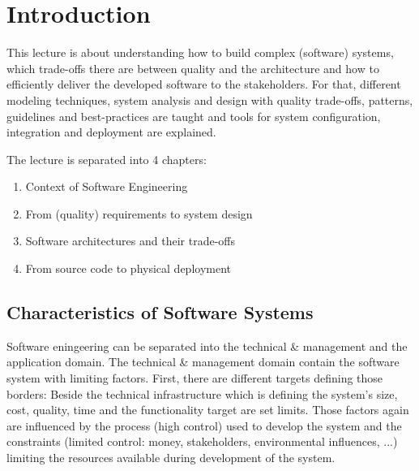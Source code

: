 
\section{Introduction}
This lecture is about understanding how to build complex (software) systems, which trade-offs there are between quality and the architecture and how to efficiently deliver the developed software to the stakeholders.
For that, different modeling techniques, system analysis and design with quality trade-offs, patterns, guidelines and best-practices are taught and tools for system configuration, integration and deployment are explained.

The lecture is separated into 4 chapters:
\begin{enumerate}
    \item Context of Software Engineering
    \item From (quality) requirements to system design
    \item Software architectures and their trade-offs
    \item From source code to physical deployment
\end{enumerate}

\subsection{Characteristics of Software Systems}
Software eningeering can be separated into the technical \& management and the application domain.
The technical \& management domain contain the software system with limiting factors.
First, there are different targets defining those borders: Beside the technical infrastructure which is defining the system's size, cost, quality, time and the functionality target are set limits.
Those factors again are influenced by the process (high control) used to develop the system and the constraints (limited control: money, stakeholders, environmental influences, ...) limiting the resources available during development of the system.

